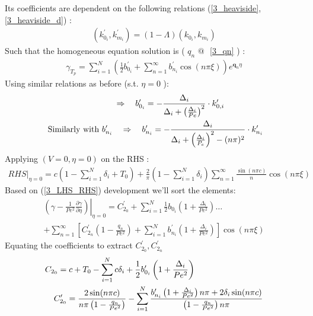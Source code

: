 \documentclass[12pt]{article}
\numberwithin{equation}{section}
\begin{document}
\begin{flushleft}
Its coefficients are dependent on the following relations (\ref{3_heaviside}, \ref{3_heaviside_d}) :
\begin{align} \label{4_kp_i}
\left(k_{0_{i}}^{\prime}, k_{m_{i}}^{\prime}\right)=(1-\Lambda)\left(k_{0_{i}}, k_{m_{i}}\right)
\end{align}
Such that the homogeneous equation solution is ( $q_{n} \text { @ } $ \ref{3_qn} ) :
\begin{align}
\gamma_{T_{p}}=\sum_{i=1}^{N}\left(\frac{1}{2} b_{0_{i}}^{\prime}+\sum_{n=1}^{\infty} b_{n_{i}}^{\prime} \cos (n \pi \xi)\right) e^{\mathbf{q}_{n} \eta}
\end{align}
Using similar relations as before (s.t. $\eta=0$ ):
\begin{align}
\Rightarrow \quad b_{0_{i}}^{\prime} =-\frac{\Delta_{i}}{\Delta_{i}+\left(\frac{\Delta_{i}}{P e}\right)^{2}} \cdot k_{0, i}^{\prime} \label{bp_i} \hspace{16.5mm} \\
\text { Similarly with } b_{n_{i}}^{\prime} \quad \Rightarrow \quad b_{n_{i}}^{\prime}=-\frac{\Delta_{i}}{\Delta_{i}+\left(\frac{\Delta_{i}}{P_{e}}\right)^{2}-(n \pi)^{2}} \cdot k_{n_{i}}^{\prime} \label{bp_n}
\end{align}
Applying $(V=0, \eta=0)$ on the RHS :
\begin{align}
R H S\Big|_{\eta=0}=c\left(1-\sum_{i=1}^{N} \delta_{i}+T_{0}\right)+\frac{2}{\pi}\left(1-\sum_{i=1}^{N} \delta_{i}\right) \sum_{n=1}^{\infty} \frac{\sin (n \pi c)}{n} \cos (n \pi \xi)
\end{align}
Based on (\ref{3_LHS_RHS}) development we'll sort the elements:
\begin{align}
\left.\left(\gamma-\frac{1}{P e^{2}} \frac{\partial \gamma}{\partial \eta}\right)\right|_{\eta=0}=C_{2_{0}}^{\prime}+\sum_{i=1}^{N} \frac{1}{2} b_{0_{i}}\left(1+\frac{\Delta_{i}}{P e^{2}}\right) \ldots \\
+\sum_{n=1}^{\infty}\left[C_{2_{n}}^{\prime}\left(1-\frac{q_{n}}{P e^{2}}\right)+\sum_{i=1}^{N} b_{n_{i}}^{\prime}\left(1+\frac{\Delta_{i}}{P e^{2}}\right)\right] \cos (n \pi \xi)
\end{align}
Equating the coefficients to extract $C_{2_{0}}^{\prime}, C_{2_{n}}^{\prime}$
\begin{align}
C_{2_{0}}= c+T_{0}-\sum_{i=1}^{N} c \delta_{i}+\frac{1}{2} b_{0_{i}}^{\prime}\left(1+\frac{\Delta_{i}}{P e^{2}}\right) \hspace{29mm} \\
C_{2_{0}}^{\prime} =\frac{2 \sin (n \pi c)}{n \pi\left(1-\frac{q_{n}}{P e^{2}}\right)}-\sum_{i=1}^{N} \frac{b_{n_{i}}^{\prime} \left(1+\frac{\Delta_{i}}{P e^{2}}\right) n \pi+2 \delta_{i} \sin (n \pi c)}{\left(1-\frac{q_{n}}{P e^{2}}\right) n \pi}
\end{align}


\end{flushleft}
\end{document}
